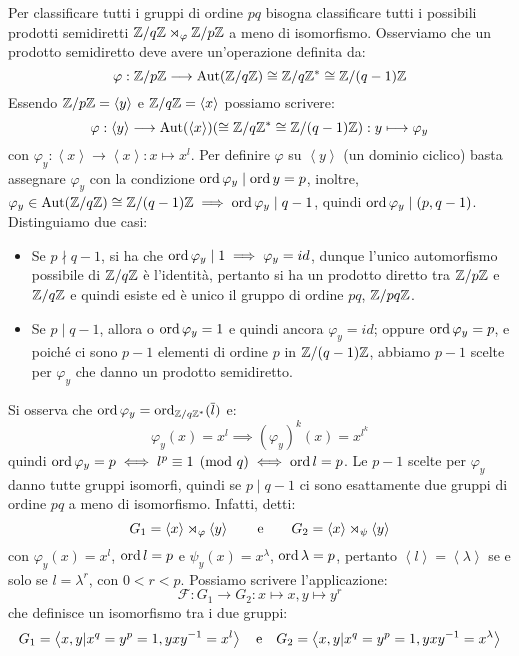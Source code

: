 \documentclass[11pt]{scrartcl}
\begin{document}
Per classificare tutti i gruppi di ordine $pq$ bisogna classificare tutti i possibili prodotti semidiretti $\mathbb Z/q\mathbb Z \rtimes_{\varphi} {\mathbb Z}/p{\mathbb Z}$ a meno di isomorfismo.
Osserviamo che un prodotto semidiretto deve avere un'operazione definita da:
\[ \varphi : {\mathbb Z}/p{\mathbb Z} \longrightarrow \operatorname{Aut}(\mathbb Z/q\mathbb Z) \cong \mathbb Z/q\mathbb Z^* \cong \mathbb Z/(q-1)\mathbb Z
            \]
Essendo ${\mathbb Z}/p{\mathbb Z} = \left<y\right>$ e $\mathbb Z/q\mathbb Z = \left<x\right>$ possiamo scrivere:
    \[ \varphi : \left<y\right> \longrightarrow \operatorname{Aut}(\left<x\right>) (\cong \mathbb Z/q\mathbb Z^* \cong \mathbb Z/(q-1)\mathbb Z) : y \longmapsto \varphi_y
            \]
con $\varphi_y : \left<x\right> \longrightarrow \left<x\right> : x \longmapsto x^l$. Per definire $\varphi$ su $\left<y\right>$ (un dominio ciclico)
basta assegnare $\varphi_y$ con la condizione $\operatorname{ord} \varphi_y \mid \operatorname{ord} y = p$, inoltre, $\varphi_y \in \operatorname{Aut}(\mathbb{Z}/{q}\mathbb{Z}) \cong \mathbb{Z}/{(q-1)}\mathbb{Z} \implies \operatorname{ord} \varphi_y \mid q-1$, 
quindi $\operatorname{ord} \varphi_y \mid (p,q-1)$. Distinguiamo due casi:
    \begin{itemize}
        \item Se $p \nmid q-1$, si ha che $\operatorname{ord} \varphi_y \mid 1 \implies \varphi_y = id$, dunque l'unico automorfismo possibile di $\mathbb{Z}/{q}\mathbb{Z}$ è l'identità, pertanto si ha un prodotto diretto tra $\mathbb{Z}/{p}\mathbb{Z}$ e
            $\mathbb{Z}/{q}\mathbb{Z}$ e quindi esiste ed è unico il gruppo di ordine $pq$, $\mathbb{Z}/{pq}\mathbb{Z}$.  
        \item Se $p \mid q-1$, allora o $\operatorname{ord} \varphi_y = 1$ e quindi ancora $\varphi_y = id$; oppure $\operatorname{ord} \varphi_y = p$, e poiché ci sono $p-1$ elementi di ordine $p$ in $\mathbb{Z}/{(q-1)}\mathbb{Z}$, abbiamo $p-1$
            scelte per $\varphi_y$ che danno un prodotto semidiretto.
    \end{itemize}
Si osserva che $\operatorname{ord} \varphi_y = \operatorname{ord}_{\mathbb{Z}/{q}\mathbb{Z}^*}(\overline l)$ e:
    \[ \varphi_y(x) = x^l \implies (\varphi_y)^k(x) = x^{l^k}
        \]
quindi $\operatorname{ord} \varphi_y = p \iff l^p \equiv 1 \pmod q \iff \operatorname{ord} l = p$.
Le $p-1$ scelte per $\varphi_y$ danno tutte gruppi isomorfi, quindi se $p \mid q-1$ ci sono esattamente due gruppi di ordine $pq$ a meno di isomorfismo. Infatti, detti:
    \[ G_1 = \left<x\right> \rtimes_{\varphi} \left<y\right>
    \qquad \text e \qquad 
    G_2 = \left<x\right> \rtimes_{\psi} \left<y\right>
        \]
con $\varphi_y(x) = x^l$, $\operatorname{ord} l = p$ e $\psi_y(x) = x^\lambda$, $\operatorname{ord} \lambda = p$, pertanto $\left<l\right> = \left<\lambda\right>$ se e solo se 
$l = \lambda^r$, con $0 < r < p$. Possiamo scrivere l'applicazione:
    \[ \mathcal{F} : G_1 \longrightarrow G_2 : x \longmapsto x, y \longmapsto y^r
        \]
che definisce un isomorfismo tra i due gruppi:
    \[ G_1 = \left<x,y | x^q = y^p = 1, yxy^{-1} = x^l\right> \quad \text e \quad G_2 = \left<x,y | x^q = y^p = 1, yxy^{-1} = x^\lambda\right>
        \]
\end{document}
